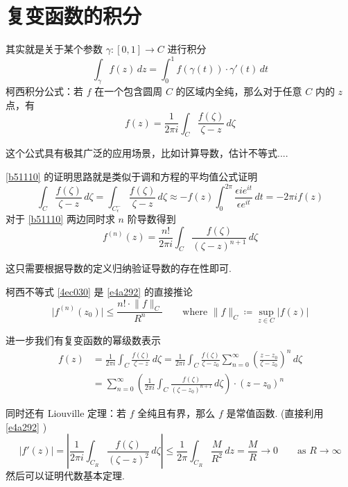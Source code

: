 \section{复变函数的积分}

其实就是关于某个参数 $\gamma:[0,1]\to C$ 进行积分
\[
\int_{\gamma}^{} f(z) \, dz =\int_{0}^{1} f(\gamma(t))\cdot\gamma'(t)  \, dt 
\]
柯西积分公式：若 $f$ 在一个包含圆周 $C$ 的区域内全纯，那么对于任意 $C$ 内的 $z$ 点，有
\begin{equation}
f(z)=\frac{1}{2\pi i}\int_{C}^{} \frac{f(\zeta)}{\zeta-z} \, d\zeta
\label{b51110}
\end{equation}

这个公式具有极其广泛的应用场景，比如计算导数，估计不等式....

\cref{b51110} 的证明思路就是类似于调和方程的平均值公式证明
\[
\int_{C}^{} \frac{f(\zeta)}{\zeta-z} \, d\zeta=\int_{C_{\epsilon}^{-}}^{} \frac{f(\zeta)}{\zeta-z} \, d\zeta \approx -f(z)\int_{0}^{2\pi} \frac{\epsilon ie^{ it }}{\epsilon e^{ it }} \, dt=-2\pi if(z)   
\]
对于 \cref{b51110} 两边同时求 $n$ 阶导数得到
\begin{equation}
f^{(n)}(z)=\frac{n!}{2\pi i}\int_{C}^{} \frac{f(\zeta)}{(\zeta-z)^{n+1}} \, d\zeta
\label{e4a292}
\end{equation}

这只需要根据导数的定义归纳验证导数的存在性即可.

柯西不等式 \cref{4ec030} 是 \cref{e4a292} 的直接推论
\begin{equation}
\lvert f^{(n)}(z_0) \rvert \leq \frac{n!\cdot \lVert f \rVert _{C}}{R^{n}}\qquad \text{where }\lVert f \rVert _{C}\coloneqq \sup_{z\in C}\lvert f(z) \rvert
\label{4ec030}
\end{equation}

进一步我们有复变函数的幂级数表示
\begin{equation}
\begin{aligned}
f(z) & =\frac{1}{2\pi i}\int_{C}^{} \frac{f(\zeta)}{\zeta-z} \, d\zeta=\frac{1}{2\pi i} \int_{C}^{} \frac{f(\zeta)}{\zeta-z_0} \sum_{n=0}^{\infty} \left( \frac{z-z_0}{\zeta-z_0} \right)^{n} \, d\zeta    \\
 & =\sum_{n=0}^{\infty }\left( \frac{1}{2\pi i} \int_{C}^{} \frac{f(\zeta)}{(\zeta-z_0)^{n+1}} \, d\zeta  \right)\cdot(z-z_0)^{n}  
\end{aligned}
\label{945f8c}
\end{equation}

同时还有 Liouville 定理：若 $f$ 全纯且有界，那么 $f$ 是常值函数. (直接利用 \cref{e4a292} )
\[
\lvert f'(z) \rvert =\left\lvert  \frac{1}{2\pi i}\int_{C_{R}}^{} \frac{f(\zeta)}{(\zeta-z)^{2}} \, d\zeta   \right\rvert  \leq \frac{1}{2\pi}\int_{C_{R}}^{} \frac{M}{R^2} \, dz=\frac{M}{R}  \to0\qquad \text{as }R\to \infty
\]
然后可以证明代数基本定理.

